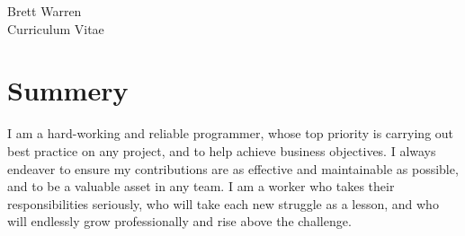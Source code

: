 \documentclass[10pt]{article} %
\begin{document}
\begin{paracol}{2} %


\parbox[top][0.12\textheight][c]{\linewidth}{ %
	\vspace{-0.04\textheight} %
	\centering %
	{\sffamily\Huge Brett Warren}\\\medskip %
	{\Huge\color{headings}\cvtextfont Curriculum Vitae}
}


\section{Summery}



I am a hard-working and reliable programmer, whose top priority is carrying out best practice on any project, and to help achieve business objectives. I always endeaver to ensure my contributions are as effective and maintainable as possible, and to be a valuable asset in any team. I am a worker who takes their responsibilities seriously, who will take each new struggle as a lesson, and who will endlessly grow professionally and rise above the challenge.


\end{paracol}
\end{document}
